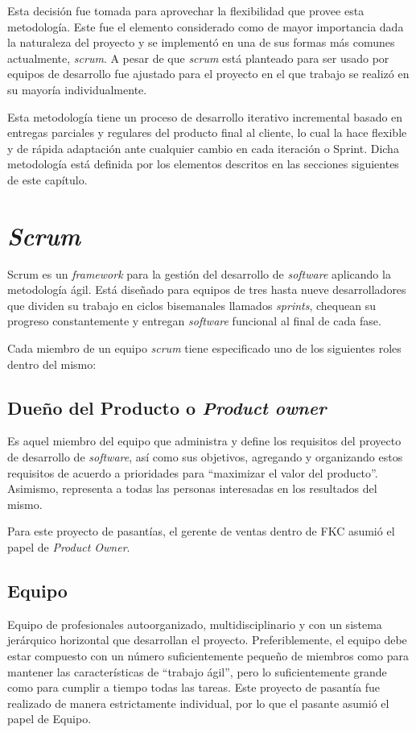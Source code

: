 Esta decisión fue tomada para aprovechar la flexibilidad que provee esta metodología. Este fue el elemento considerado como de mayor importancia dada la naturaleza del proyecto y se implementó en una de sus formas más comunes actualmente, \emph{scrum}. A pesar de que \emph{scrum} está planteado para ser usado por equipos de desarrollo fue ajustado para el proyecto en el que trabajo se realizó en su mayoría individualmente.

Esta metodología tiene un proceso de desarrollo iterativo incremental basado en entregas parciales y regulares del producto final al cliente, lo cual la hace flexible y de rápida adaptación ante cualquier cambio en cada iteración o Sprint. Dicha metodología está definida por los elementos descritos en las secciones siguientes de este capítulo.

\section{\emph{Scrum}}

Scrum es un \emph{framework} para la gestión del desarrollo de \emph{software} aplicando la metodología ágil. Está diseñado para equipos de tres hasta nueve desarrolladores que dividen su trabajo en ciclos bisemanales llamados \emph{sprints}, chequean su progreso constantemente y entregan \emph{software} funcional al final de cada fase\cite{bib:scrum}. 

Cada miembro de un equipo \emph{scrum} tiene especificado uno de los siguientes roles dentro del mismo:

\subsection{Dueño del Producto o \emph{Product owner}}
Es aquel miembro del equipo que administra y define los requisitos del proyecto de desarrollo de \emph{software}, así como sus objetivos, agregando y organizando estos requisitos de acuerdo a prioridades para “maximizar el valor del producto”. Asimismo, representa a todas las personas interesadas en los resultados del mismo.

Para este proyecto de pasantías, el gerente de ventas dentro de \gls{FKC} asumió el papel de \emph{Product Owner}.

\subsection{Equipo}
Equipo de profesionales autoorganizado, multidisciplinario y con un sistema jerárquico horizontal que desarrollan el proyecto. Preferiblemente, el equipo debe estar compuesto con un número suficientemente pequeño de miembros como para mantener las características de “trabajo ágil”, pero lo suficientemente grande como para cumplir a tiempo todas las tareas.
Este proyecto de pasantía fue realizado de manera estrictamente individual, por lo que el pasante asumió el papel de Equipo.

